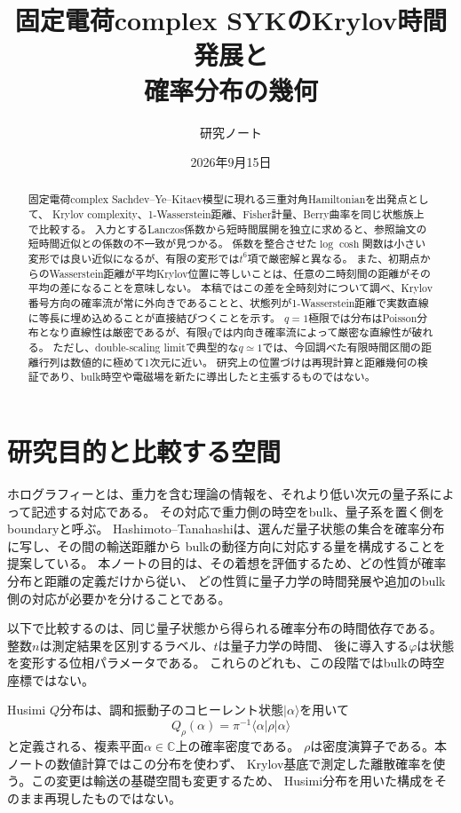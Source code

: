 \documentclass[a4paper,11pt]{ltjsarticle}
\title{固定電荷complex SYKのKrylov時間発展と\\確率分布の幾何}
\author{研究ノート}
\date{2026年9月15日}
\numberwithin{equation}{section}
\newcommand{\ket}[1]{\lvert #1\rangle}
\newcommand{\bra}[1]{\langle #1\rvert}
\begin{document}
\maketitle
\begin{abstract}
固定電荷complex Sachdev--Ye--Kitaev模型に現れる三重対角Hamiltonianを出発点として、
Krylov complexity、1-Wasserstein距離、Fisher計量、Berry曲率を同じ状態族上で比較する。
入力とするLanczos係数から短時間展開を独立に求めると、参照論文の短時間近似との係数の不一致が見つかる。
係数を整合させた$\log\cosh$関数は小さい変形では良い近似になるが、有限の変形では$t^6$項で厳密解と異なる。
また、初期点からのWasserstein距離が平均Krylov位置に等しいことは、任意の二時刻間の距離がその平均の差になることを意味しない。
本稿ではこの差を全時刻対について調べ、Krylov番号方向の確率流が常に外向きであることと、状態列が1-Wasserstein距離で実数直線に等長に埋め込めることが直接結びつくことを示す。
$q=1$極限では分布はPoisson分布となり直線性は厳密であるが、有限$q$では内向き確率流によって厳密な直線性が破れる。
ただし、double-scaling limitで典型的な$q\simeq1$では、今回調べた有限時間区間の距離行列は数値的に極めて1次元に近い。
研究上の位置づけは再現計算と距離幾何の検証であり、bulk時空や電磁場を新たに導出したと主張するものではない。
\end{abstract}
\tableofcontents

\section{研究目的と比較する空間}
ホログラフィーとは、重力を含む理論の情報を、それより低い次元の量子系によって記述する対応である。
その対応で重力側の時空をbulk、量子系を置く側をboundaryと呼ぶ。
Hashimoto--Tanahashiは、選んだ量子状態の集合を確率分布に写し、その間の輸送距離から
bulkの動径方向に対応する量を構成することを提案している\cite{HashimotoTanahashi}。
本ノートの目的は、その着想を評価するため、どの性質が確率分布と距離の定義だけから従い、
どの性質に量子力学の時間発展や追加のbulk側の対応が必要かを分けることである。

以下で比較するのは、同じ量子状態から得られる確率分布の時間依存である。
整数$n$は測定結果を区別するラベル、$t$は量子力学の時間、
後に導入する$\varphi$は状態を変形する位相パラメータである。
これらのどれも、この段階ではbulkの時空座標ではない。

Husimi $Q$分布は、調和振動子のコヒーレント状態$\ket{\alpha}$を用いて
\begin{equation}
 Q_\rho(\alpha)=\pi^{-1}\bra{\alpha}\rho\ket{\alpha}
 \label{eq:husimi}
\end{equation}
と定義される、複素平面$\alpha\in\mathbb C$上の確率密度である。
$\rho$は密度演算子である。本ノートの数値計算ではこの分布を使わず、
Krylov基底で測定した離散確率を使う。この変更は輸送の基礎空間も変更するため、
Husimi分布を用いた構成をそのまま再現したものではない。
\end{document}
